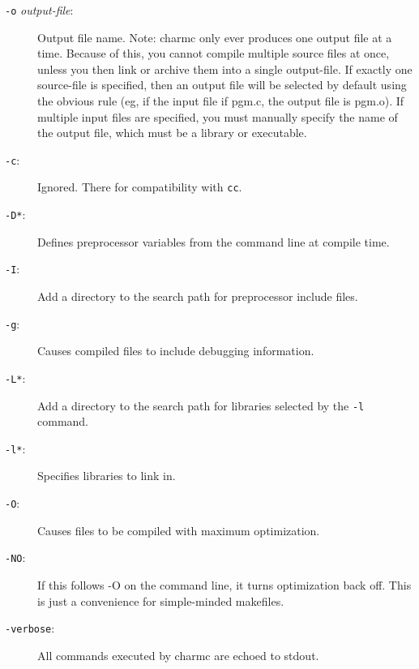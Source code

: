 \begin{description}

\item[{\tt -o} {\em output-file}:]

Output file name.  Note: charmc only ever produces one output file at
a time.  Because of this, you cannot compile multiple source files at
once, unless you then link or archive them into a single output-file.
If exactly one source-file is specified, then an output file will be
selected by default using the obvious rule (eg, if the input file if
pgm.c, the output file is pgm.o).  If multiple input files are
specified, you must manually specify the name of the output file,
which must be a library or executable.

\item[{\tt -c}:]

Ignored.  There for compatibility with {\tt cc}.

\item[{\tt -D*}:]

Defines preprocessor variables from the command line at compile time.

\item[{\tt -I}:]

Add a directory to the search path for preprocessor include files.

\item[{\tt -g}:]

Causes compiled files to include debugging information.

\item[{\tt -L*}:]

Add a directory to the search path for libraries selected by
the {\tt -l} command.

\item[{\tt -l*}:]

Specifies libraries to link in.

\item[{\tt -O}:]

Causes files to be compiled with maximum optimization.

\item[{\tt -NO}:]

If this follows -O on the command line, it turns optimization back off.
This is just a convenience for simple-minded makefiles.

\item[{\tt -verbose}:]

All commands executed by charmc are echoed to stdout.


\end{description}
